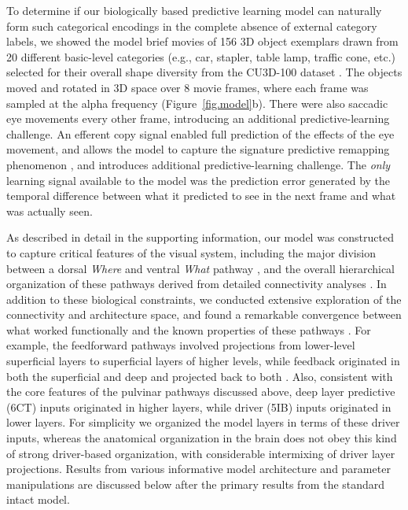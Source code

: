 \documentclass[11pt,twoside]{article}
\newif\myifpdf
\begin{document}
To determine if our biologically based predictive learning model can naturally form such categorical encodings in the complete absence of external category labels, we showed the model brief movies of 156 3D object exemplars drawn from 20 different basic-level categories (e.g., car, stapler, table lamp, traffic cone, etc.) selected for their overall shape diversity from the CU3D-100 dataset \cite{OReillyWyatteHerdEtAl13}.  The objects moved and rotated in 3D space over 8 movie frames, where each frame was sampled at the alpha frequency (Figure~\ref{fig.model}b).  There were also saccadic eye movements every other frame, introducing an additional predictive-learning challenge.  An efferent copy signal enabled full prediction of the effects of the eye movement, and allows the model to capture the signature predictive remapping phenomenon \cite{DuhamelColbyGoldberg92,CavanaghHuntAfrazEtAl10}, and introduces additional predictive-learning challenge.  The \emph{only} learning signal available to the model was the prediction error generated by the temporal difference between what it predicted to see in the next frame and what was actually seen.

As described in detail in the supporting information, our model was constructed to capture critical features of the visual system, including the major division between a dorsal \emph{Where} and ventral \emph{What} pathway \cite{UngerleiderMishkin82}, and the overall hierarchical organization of these pathways derived from detailed connectivity analyses \cite{RocklandPandya79,FellemanVanEssen91,MarkovVezoliChameauEtAl14,MarkovErcsey-RavaszGomesEtAl14}.  In addition to these biological constraints, we conducted extensive exploration of the connectivity and architecture space, and found a remarkable convergence between what worked functionally and the known properties of these pathways \cite{OReillyWyatteRohrlich17}.  For example, the feedforward pathways involved projections from lower-level superficial layers to superficial layers of higher levels, while feedback originated in both the superficial and deep and projected back to both \cite{RocklandPandya79,FellemanVanEssen91}.  Also, consistent with the core features of the pulvinar pathways discussed above, deep layer predictive (6CT) inputs originated in higher layers, while driver (5IB) inputs originated in lower layers.  For simplicity we organized the model layers in terms of these driver inputs, whereas the anatomical organization in the brain does not obey this kind of strong driver-based organization, with considerable intermixing of driver layer projections.  Results from various informative model architecture and parameter manipulations are discussed below after the primary results from the standard intact model.
\end{document}
